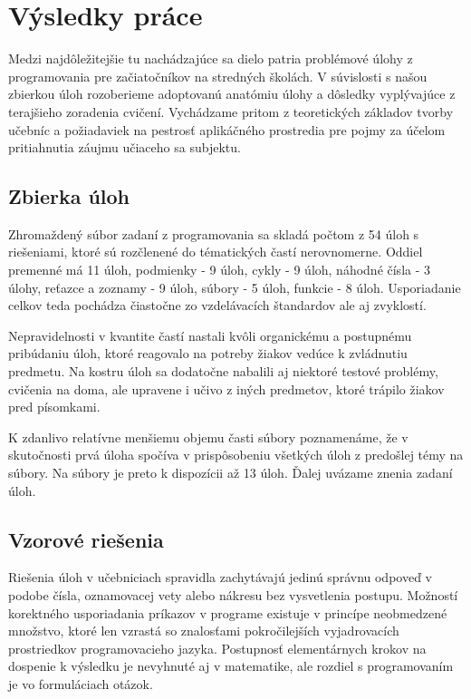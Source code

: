 \chapter{Výsledky práce}
Medzi najdôležitejšie tu nachádzajúce sa dielo patria problémové úlohy z programovania pre začiatočníkov na stredných školách. V súvislosti s našou zbierkou úloh rozoberieme adoptovanú anatómiu úlohy a dôsledky vyplývajúce z terajšieho zoradenia cvičení. Vychádzame pritom z teoretických základov tvorby učebníc a požiadaviek na pestrosť aplikáčného prostredia pre pojmy za účelom pritiahnutia záujmu učiaceho sa subjektu.

\section{Zbierka úloh}
Zhromaždený súbor zadaní z programovania sa skladá počtom z 54 úloh s riešeniami, ktoré sú rozčlenené do tématických častí nerovnomerne. Oddiel premenné má 11 úloh, podmienky - 9 úloh, cykly - 9 úloh, náhodné čísla - 3 úlohy, reťazce a zoznamy - 9 úloh, súbory - 5 úloh, funkcie - 8 úloh. Usporiadanie celkov teda pochádza čiastočne zo vzdelávacích štandardov ale aj zvyklostí.

Nepravidelnosti v kvantite častí nastali kvôli organickému a postupnému pribúdaniu úloh, ktoré reagovalo na potreby žiakov vedúce k zvládnutiu predmetu. Na kostru úloh sa dodatočne nabalili aj niektoré testové problémy, cvičenia na doma, ale upravene i učivo z iných predmetov, ktoré trápilo žiakov pred písomkami. 

K zdanlivo relatívne menšiemu objemu časti súbory poznamenáme, že v skutočnosti prvá úloha spočíva v prispôsobeniu všetkých úloh z predošlej témy na súbory. Na súbory je preto k dispozícii až 13 úloh. Ďalej uvázame znenia zadaní úloh.









\section{Vzorové riešenia}
Riešenia úloh v učebniciach spravidla zachytávajú jedinú správnu odpoveď v podobe čísla, oznamovacej vety alebo nákresu bez vysvetlenia postupu. Možností korektného usporiadania príkazov v programe existuje v princípe neobmedzené množstvo, ktoré len vzrastá so znalosťami pokročilejších vyjadrovacích prostriedkov programovacieho jazyka. Postupnosť elementárnych krokov na dospenie k výsledku je nevyhnuté aj v matematike, ale rozdiel s programovaním je vo formuláciach otázok. 

